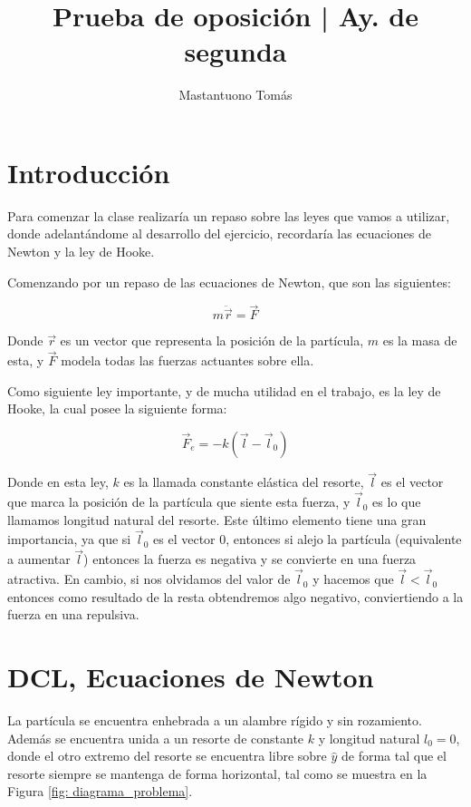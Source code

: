 \documentclass{article}
\author{Mastantuono Tomás}
\begin{document}
\title{Prueba de oposición | Ay. de segunda}
\date{}
\maketitle

\begin{multicols}{2}

    \section*{Introducción}
\label{introducción}

Para comenzar la clase realizaría un repaso sobre las leyes que vamos a utilizar, donde adelantándome al desarrollo del ejercicio, recordaría las ecuaciones de Newton y la ley de Hooke.

Comenzando por un repaso de las ecuaciones de Newton, que son las siguientes:

\begin{equation}
    m\ddot{\vec{r}} = \vec{F}
\end{equation}

Donde $\vec{r}$ es un vector que representa la posición de la partícula, $m$ es la masa de esta, y $\vec{F}$ modela todas las fuerzas actuantes sobre ella.

Como siguiente ley importante, y de mucha utilidad en el trabajo, es la ley de Hooke, la cual posee la siguiente forma:

\begin{equation}
    \vec{F}_e = -k(\vec{l} - \vec{l}_0)
\end{equation}

Donde en esta ley, $k$ es la llamada constante elástica del resorte, $\vec{l}$ es el vector que marca la posición de la partícula que siente esta fuerza, y $\vec{l}_0$ es lo que llamamos longitud natural del resorte. Este último elemento tiene una gran importancia, ya que si $\vec{l}_0$ es el vector $0$, entonces si alejo la partícula (equivalente a aumentar $\vec{l}$) entonces la fuerza es negativa y se convierte en una fuerza atractiva. En cambio, si nos olvidamos del valor de $\vec{l}_0$ y hacemos que $\vec{l} < \vec{l}_0$ entonces como resultado de la resta obtendremos algo negativo, conviertiendo a la fuerza en una repulsiva.

\section{DCL, Ecuaciones de Newton}
La partícula se encuentra enhebrada a un alambre rígido y sin rozamiento. Además se encuentra unida a un resorte de constante $k$ y longitud natural $l_0 = 0$, donde el otro extremo del resorte se encuentra libre sobre $\hat{y}$ de forma tal que el resorte siempre se mantenga de forma horizontal, tal como se muestra en la Figura \ref{fig: diagrama_problema}.


\end{multicols}
\end{document}
